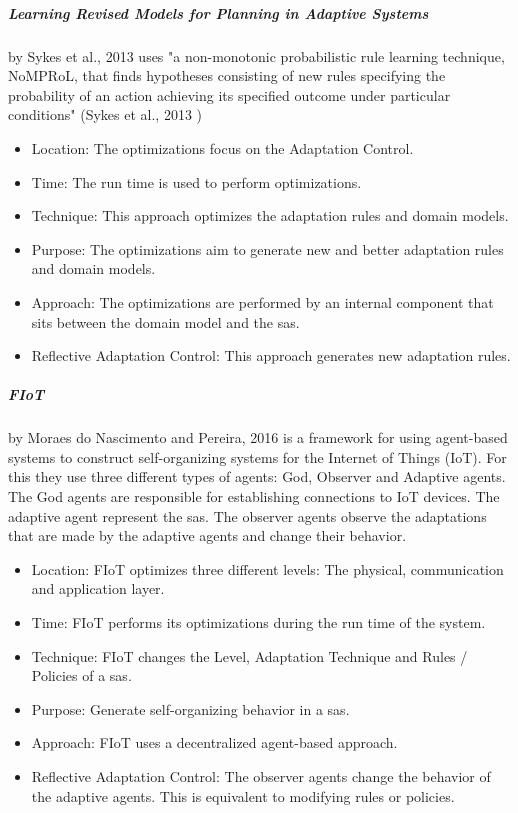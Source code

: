\subparagraph*{Learning Revised Models for Planning in Adaptive Systems}
by Sykes et al., 2013 \cite*{LearningRevisedModels} uses
"a non-monotonic
probabilistic rule learning technique, NoMPRoL, that finds
hypotheses consisting of new rules specifying the probability
of an action achieving its specified outcome under particular
conditions" (Sykes et al., 2013 \cite*{LearningRevisedModels})
\begin{itemize}[nosep]
    \item Location: The optimizations focus on the Adaptation Control.
    \item Time: The run time is used to perform optimizations.
    \item Technique: This approach optimizes the adaptation rules and domain models.
    \item Purpose: The optimizations aim to generate new and better adaptation rules and domain models.
    \item Approach: The optimizations are performed by an internal component that sits between the domain model
    and the \acrshort{sas}.
    \item Reflective Adaptation Control: This approach generates new adaptation rules.
\end{itemize}

\subparagraph*{FIoT}
by Moraes do Nascimento and Pereira, 2016 \cite*{FIoT} is a framework for using agent-based systems
to construct self-organizing systems for the Internet of Things (IoT).
For this they use three different types of agents: God, Observer and Adaptive agents.
The God agents are responsible for establishing connections to IoT devices.
The adaptive agent represent the \acrlong{sas}.
The observer agents observe the adaptations that are made by the adaptive agents
and change their behavior.
\begin{itemize}[nosep]
    \item Location: FIoT optimizes three different levels: The physical, communication and application layer.
    \item Time: FIoT performs its optimizations during the run time of the system.
    \item Technique: FIoT changes the Level, Adaptation Technique and Rules / Policies of a \acrshort{sas}.
    \item Purpose: Generate self-organizing behavior in a \acrshort{sas}.
    \item Approach: FIoT uses a decentralized agent-based approach.
    \item Reflective Adaptation Control: The observer agents change the behavior of the adaptive agents.
    This is equivalent to modifying rules or policies.
\end{itemize}